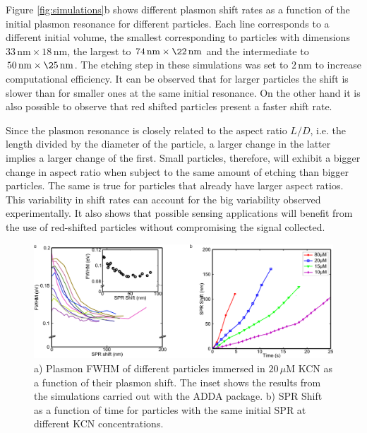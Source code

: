 \documentclass[a4paper,oneside,onecolumn]{article}
\newcommand{\nm}{\ensuremath{\,\textrm{nm}}}
\newcommand{\uM}{\ensuremath{\,\mu\textrm{M}}}
\begin{document}
Figure \ref{fig:simulations}b shows different plasmon shift rates as a function of the initial plasmon resonance for different
particles. Each line corresponds to a different initial volume, the smallest corresponding to particles with dimensions $33\nm\times18\nm$, the largest to $74\nm\times\22\nm$ and the intermediate to $50\nm\times\25\nm$. The etching step in these simulations was set to $2\nm$ to increase computational efficiency. It can be observed that for larger particles the shift is slower than for smaller ones at the same initial resonance. On the other hand it is also possible to observe that red shifted particles present a faster shift rate.

Since the plasmon resonance is closely related to the aspect ratio $L/D$, i.e. the length divided by the diameter of the particle, a larger change in the latter implies a larger change of the first. Small particles, therefore, will exhibit a bigger change in aspect ratio when subject to the same amount of etching than bigger particles. The same is true for particles that already have larger aspect ratios. This variability in shift rates can account for the big variability observed experimentally. It also shows that possible sensing applications will benefit from the use of red-shifted particles without compromising the signal collected.

\begin{figure}[p]
 \centering
 \includegraphics[width=0.95\linewidth]{Figures/03_Shifts/shifts.png}
 \caption{a) Plasmon FWHM of different particles immersed in $20\uM$
 KCN as a function of their plasmon shift. The inset shows the results from the
 simulations carried out with the ADDA package. b) SPR Shift as a function of
 time for particles with the same initial SPR at different KCN concentrations.}
 \label{fig:FWHM}
\end{figure}
\end{document}
